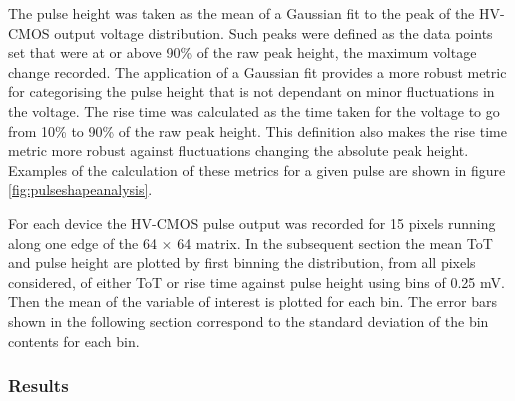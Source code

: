 The pulse height was taken as the mean of a Gaussian fit to the peak of the HV-CMOS output voltage distribution.  Such peaks were defined as the data points set that were at or above 90\% of the raw peak height, the maximum voltage change recorded.  The application of a Gaussian fit provides a more robust metric for categorising the pulse height that is not dependant on minor fluctuations in the voltage.  The rise time was calculated as the time taken for the voltage to go from 10\% to 90\% of the raw peak height.  This definition also makes the rise time metric more robust against fluctuations changing the absolute peak height.  Examples of the calculation of these metrics for a given pulse are shown in figure \ref{fig:pulseshapeanalysis}.

For each device the HV-CMOS pulse output was recorded for 15 pixels running along one edge of the 64 $\times$ 64 matrix.  In the subsequent section the mean ToT and pulse height are plotted by first binning the distribution, from all pixels considered, of either ToT or rise time against pulse height using bins of 0.25 mV.  Then the mean of the variable of interest is plotted for each bin.  The error bars shown in the following section correspond to the standard deviation of the bin contents for each bin.   

\subsubsection{Results}


